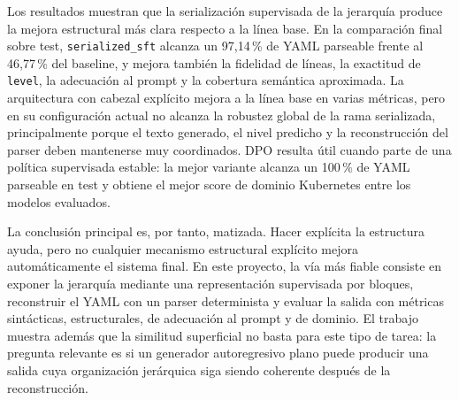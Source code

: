 Los resultados muestran que la serialización supervisada de la jerarquía produce la mejora estructural más clara respecto a la línea base. En la comparación final sobre test, \texttt{serialized\_sft} alcanza un 97,14\,\% de YAML parseable frente al 46,77\,\% del baseline, y mejora también la fidelidad de líneas, la exactitud de \texttt{level}, la adecuación al prompt y la cobertura semántica aproximada. La arquitectura con cabezal explícito mejora a la línea base en varias métricas, pero en su configuración actual no alcanza la robustez global de la rama serializada, principalmente porque el texto generado, el nivel predicho y la reconstrucción del parser deben mantenerse muy coordinados. DPO resulta útil cuando parte de una política supervisada estable: la mejor variante alcanza un 100\,\% de YAML parseable en test y obtiene el mejor score de dominio Kubernetes entre los modelos evaluados.

La conclusión principal es, por tanto, matizada. Hacer explícita la estructura ayuda, pero no cualquier mecanismo estructural explícito mejora automáticamente el sistema final. En este proyecto, la vía más fiable consiste en exponer la jerarquía mediante una representación supervisada por bloques, reconstruir el YAML con un parser determinista y evaluar la salida con métricas sintácticas, estructurales, de adecuación al prompt y de dominio. El trabajo muestra además que la similitud superficial no basta para este tipo de tarea: la pregunta relevante es si un generador autoregresivo plano puede producir una salida cuya organización jerárquica siga siendo coherente después de la reconstrucción.
